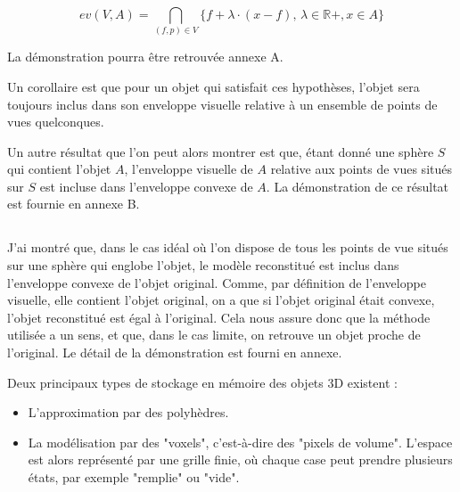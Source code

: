 \documentclass[a4paper]{article}
\begin{document}
      \[
      ev(V, A) = \bigcap_{(f, p) \in V} \{f + \lambda \cdot (x - f), \, \lambda \in \mathbb{R}+, x \in A\}
      \]

      La démonstration pourra être retrouvée annexe A.

      Un corollaire est que pour un objet qui satisfait ces hypothèses, l'objet sera toujours inclus dans son enveloppe visuelle relative à un ensemble de points de vues quelconques.

      Un autre résultat que l'on peut alors montrer est que, étant donné une sphère $S$ qui contient l'objet $A$, l'enveloppe visuelle de $A$ relative aux points de vues situés sur $S$ est  incluse dans l'enveloppe convexe de $A$. La démonstration de ce résultat est fournie en annexe B.

    \subsection{}
      J’ai montré que, dans le cas idéal où l’on dispose de tous les points de vue situés sur une sphère qui englobe l’objet, le modèle reconstitué est inclus dans l’enveloppe convexe de l’objet original. Comme, par définition de l’enveloppe visuelle, elle contient l’objet original, on a que si l’objet original était convexe, l’objet reconstitué est égal à l’original. Cela nous assure donc que la méthode utilisée a un sens, et que, dans le cas limite, on retrouve un objet proche de l’original. Le détail de la démonstration est fourni en annexe.

      Deux principaux types de stockage en mémoire des objets 3D existent :
      \begin{itemize}
        \item L'approximation par des polyhèdres.
        \item La modélisation par des "voxels", c'est-à-dire des "pixels de volume". L'espace est alors représenté par une grille finie, où chaque case peut prendre plusieurs états, par exemple "remplie" ou "vide".
      \end{itemize}
      
\end{document}
